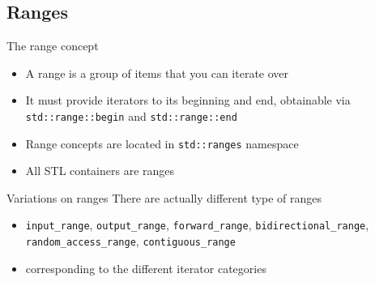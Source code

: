 \subsection[range]{Ranges}

\begin{frame}[fragile]
  \begin{block}{The range concept}
    \begin{itemize}
    \item A range is a group of items that you can iterate over
    \item It must provide iterators to its beginning and end, obtainable via \texttt{std::range::begin} and \texttt{std::range::end}
    \item Range concepts are located in \texttt{std::ranges} namespace
    \item All STL containers are ranges
    \end{itemize}
  \end{block}
  \begin{exampleblock}{Variations on ranges}
    There are actually different type of ranges
    \begin{itemize}
    \item \texttt{input_range}, \texttt{output_range}, \texttt{forward_range}, \texttt{bidirectional_range}, \texttt{random_access_range}, \texttt{contiguous_range}
    \item corresponding to the different iterator categories
    \end{itemize}
  \end{exampleblock}
\end{frame}

